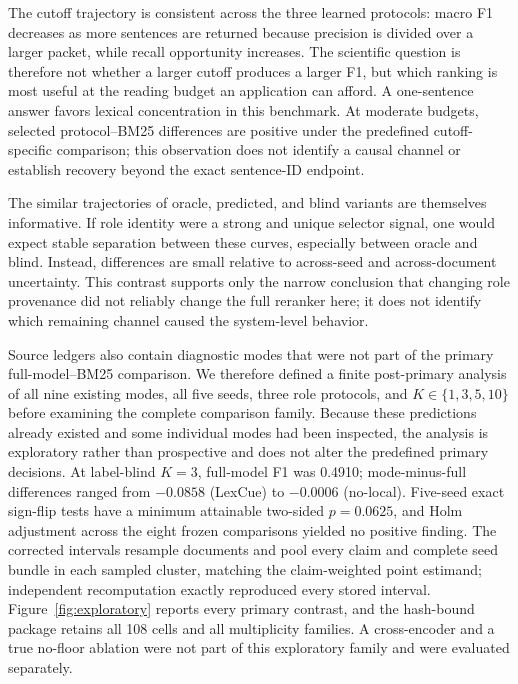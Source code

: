 \documentclass[applsci,article,submit,moreauthors]{Definitions/mdpi}
\begin{document}
The cutoff trajectory is consistent across the three learned protocols: macro F1 decreases as more sentences are returned because precision is divided over a larger packet, while recall opportunity increases. The scientific question is therefore not whether a larger cutoff produces a larger F1, but which ranking is most useful at the reading budget an application can afford. A one-sentence answer favors lexical concentration in this benchmark. At moderate budgets, selected protocol--BM25 differences are positive under the predefined cutoff-specific comparison; this observation does not identify a causal channel or establish recovery beyond the exact sentence-ID endpoint.

The similar trajectories of oracle, predicted, and blind variants are themselves informative. If role identity were a strong and unique selector signal, one would expect stable separation between these curves, especially between oracle and blind. Instead, differences are small relative to across-seed and across-document uncertainty. This contrast supports only the narrow conclusion that changing role provenance did not reliably change the full reranker here; it does not identify which remaining channel caused the system-level behavior.

Source ledgers also contain diagnostic modes that were not part of the primary full-model--BM25 comparison. We therefore defined a finite post-primary analysis of all nine existing modes, all five seeds, three role protocols, and $K\in\{1,3,5,10\}$ before examining the complete comparison family. Because these predictions already existed and some individual modes had been inspected, the analysis is exploratory rather than prospective and does not alter the predefined primary decisions. At label-blind $K=3$, full-model F1 was 0.4910; mode-minus-full differences ranged from $-0.0858$ (LexCue) to $-0.0006$ (no-local). Five-seed exact sign-flip tests have a minimum attainable two-sided $p=0.0625$, and Holm adjustment across the eight frozen comparisons yielded no positive finding. The corrected intervals resample documents and pool every claim and complete seed bundle in each sampled cluster, matching the claim-weighted point estimand; independent recomputation exactly reproduced every stored interval. Figure~\ref{fig:exploratory} reports every primary contrast, and the hash-bound package retains all 108 cells and all multiplicity families. A cross-encoder and a true no-floor ablation were not part of this exploratory family and were evaluated separately.
\end{document}
